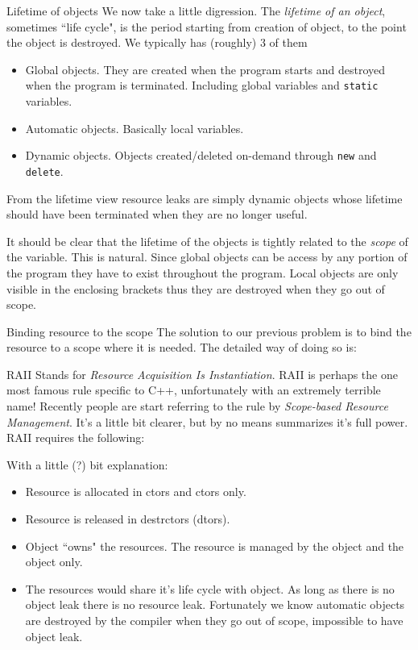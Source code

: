 \begin{frame}{Lifetime of objects}
\small
We now take a little digression. The \textit{lifetime of an object}, sometimes ``life cycle", is the period starting from creation of object, to the point the object is destroyed. We typically has (roughly) 3 of them
\begin{itemize}
\item Global objects. They are created when the program starts and destroyed when the program is terminated. Including global variables and \texttt{static} variables.
\item Automatic objects. Basically local variables.
\item Dynamic objects. Objects created/deleted on-demand through \texttt{new} and \texttt{delete}.
\end{itemize}
From the lifetime view resource leaks are simply dynamic objects whose lifetime should have been terminated when they are no longer useful.

It should be clear that the lifetime of the objects is tightly related to the \textit{scope} of the variable. This is natural. Since global objects can be access by any portion of the program they have to exist throughout the program. Local objects are only visible in the enclosing brackets thus they are destroyed when they go out of scope. 
\end{frame}

\begin{frame}{Binding resource to the scope}
The solution to our previous problem is to bind the resource to a scope where it is needed. The detailed way of doing so is:
\end{frame}

\begin{frame}{RAII}
\small
Stands for \textit{Resource Acquisition Is Instantiation}. RAII is perhaps the one most famous rule specific to C++, unfortunately with an extremely terrible name! Recently people are start referring to the rule by \textit{Scope-based Resource Management}. It's a little bit clearer, but by no means summarizes it's full power. RAII requires the following:
\begin{center}
\end{center}
With a little (?) bit explanation:
\begin{itemize}
\item Resource is allocated in ctors and ctors only.
\item Resource is released in destrctors (dtors).
\item Object ``owns" the resources. The resource is managed by the object and the object only. 
\item The resources would share it's life cycle with object. As long as there is no object leak there is no resource leak. Fortunately we know automatic objects are destroyed by the compiler when they go out of scope, impossible to have object leak.
\end{itemize}
\end{frame}

